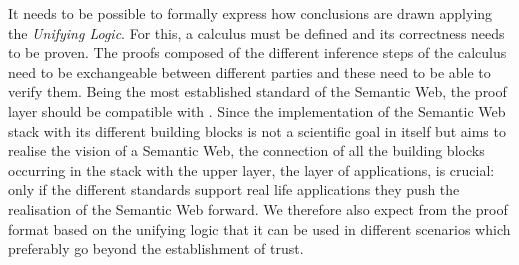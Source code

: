 %
%
%
It needs to be possible to formally express how conclusions are drawn applying the \emph{Unifying Logic}.
For this, a calculus must be defined and its correctness needs to be proven. The proofs composed of the different inference steps of the calculus need to be exchangeable between 
different parties and these need to be able to verify them. Being the most established standard of the Semantic Web, the proof layer should be compatible with \rdf. 
Since the implementation of the
Semantic Web stack with its different building blocks is not a scientific goal in itself but aims to realise the vision of a Semantic Web, the connection of all the building blocks 
occurring in the stack with the upper layer, the layer of applications, is crucial: only if the different standards support real life applications they push the realisation of the
Semantic Web forward. We therefore also expect from the proof format based on the unifying logic that it can be used in different scenarios which preferably go beyond the establishment of trust. 
